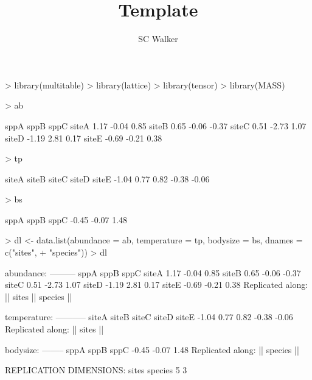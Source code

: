 \documentclass{article}
\title{Template}
\author{SC Walker}
\numberwithin{exercise}{section}
\begin{document}
\begin{Schunk}
\begin{Sinput}
> library(multitable)
> library(lattice)
> library(tensor)
> library(MASS)
\end{Sinput}
\end{Schunk}

\newpage


\begin{Schunk}
\begin{Sinput}
> ab
\end{Sinput}
\begin{Soutput}
       sppA  sppB  sppC
siteA  1.17 -0.04  0.85
siteB  0.65 -0.06 -0.37
siteC  0.51 -2.73  1.07
siteD -1.19  2.81  0.17
siteE -0.69 -0.21  0.38
\end{Soutput}
\end{Schunk}

\newpage

\begin{Schunk}
\begin{Sinput}
> tp
\end{Sinput}
\begin{Soutput}
siteA siteB siteC siteD siteE 
-1.04  0.77  0.82 -0.38 -0.06 
\end{Soutput}
\end{Schunk}

\newpage

\begin{Schunk}
\begin{Sinput}
> bs
\end{Sinput}
\begin{Soutput}
 sppA  sppB  sppC 
-0.45 -0.07  1.48 
\end{Soutput}
\end{Schunk}

\newpage

\begin{Schunk}
\begin{Sinput}
> dl <- data.list(abundance = ab, temperature = tp, bodysize = bs, dnames = c("sites", 
+     "species"))
> dl
\end{Sinput}
\begin{Soutput}
abundance:
---------
       sppA  sppB  sppC
siteA  1.17 -0.04  0.85
siteB  0.65 -0.06 -0.37
siteC  0.51 -2.73  1.07
siteD -1.19  2.81  0.17
siteE -0.69 -0.21  0.38
Replicated along:  || sites || species || 


temperature:
-----------
siteA siteB siteC siteD siteE 
-1.04  0.77  0.82 -0.38 -0.06 
Replicated along:  || sites || 


bodysize:
--------
 sppA  sppB  sppC 
-0.45 -0.07  1.48 
Replicated along:  || species || 


REPLICATION DIMENSIONS: 
  sites species 
      5       3 
\end{Soutput}
\end{Schunk}
\end{document}
